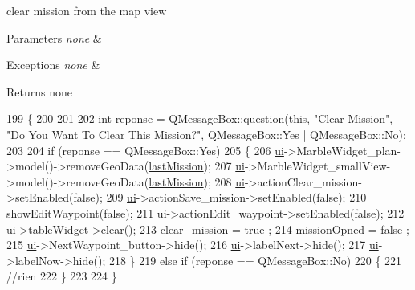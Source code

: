 clear mission from the map view 


\begin{DoxyParams}{Parameters}
{\em none} & \\
\hline
\end{DoxyParams}

\begin{DoxyExceptions}{Exceptions}
{\em none} & \\
\hline
\end{DoxyExceptions}
\begin{DoxyReturn}{Returns}
none 
\end{DoxyReturn}

\begin{DoxyCode}
199                         \{
200 
201 
202     \textcolor{keywordtype}{int} reponse =  QMessageBox::question(\textcolor{keyword}{this}, \textcolor{stringliteral}{"Clear Mission"}, \textcolor{stringliteral}{"Do You Want To Clear This Mission?"}, 
      QMessageBox::Yes | QMessageBox::No);
203 
204         \textcolor{keywordflow}{if} (reponse == QMessageBox::Yes)
205         \{
206             \hyperlink{a00008_a6dc041ef6a2ffb329928d2913e8344e6}{ui}->MarbleWidget\_plan->model()->removeGeoData(\hyperlink{a00008_a3de39ae285a10e6655db42a1dd146c69}{lastMission});
207             \hyperlink{a00008_a6dc041ef6a2ffb329928d2913e8344e6}{ui}->MarbleWidget\_smallView->model()->removeGeoData(\hyperlink{a00008_a3de39ae285a10e6655db42a1dd146c69}{lastMission});
208             \hyperlink{a00008_a6dc041ef6a2ffb329928d2913e8344e6}{ui}->actionClear\_mission->setEnabled(\textcolor{keyword}{false});
209             \hyperlink{a00008_a6dc041ef6a2ffb329928d2913e8344e6}{ui}->actionSave\_mission->setEnabled(\textcolor{keyword}{false});
210             \hyperlink{a00008_a35f9f0904259437c4ae21b41c4f759c1}{showEditWaypoint}(\textcolor{keyword}{false});
211             \hyperlink{a00008_a6dc041ef6a2ffb329928d2913e8344e6}{ui}->actionEdit\_waypoint->setEnabled(\textcolor{keyword}{false});
212             \hyperlink{a00008_a6dc041ef6a2ffb329928d2913e8344e6}{ui}->tableWidget->clear();
213             \hyperlink{a00008_a4ea0f7bc01af5b4359d7be6998600e13}{clear\_mission} = true ;
214             \hyperlink{a00008_aca4d1bee0b4e0f4f21192f73f4053ac7}{missionOpned} = false ;
215             \hyperlink{a00008_a6dc041ef6a2ffb329928d2913e8344e6}{ui}->NextWaypoint\_button->hide();
216             \hyperlink{a00008_a6dc041ef6a2ffb329928d2913e8344e6}{ui}->labelNext->hide();
217             \hyperlink{a00008_a6dc041ef6a2ffb329928d2913e8344e6}{ui}->labelNow->hide();
218         \}
219         \textcolor{keywordflow}{else} \textcolor{keywordflow}{if} (reponse == QMessageBox::No)
220         \{
221 \textcolor{comment}{//rien}
222         \}
223 
224 \}
\end{DoxyCode}
